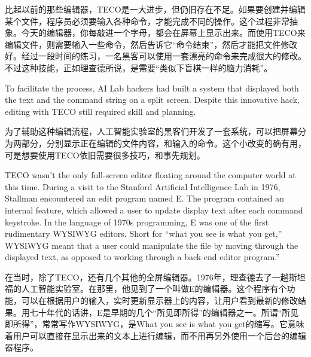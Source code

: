 \ifdefined\chs
比起以前的那些编辑器，TECO是一大进步，但仍旧存在不足。如果要创建并编辑某个文件，程序员必须要输入各种命令，才能完成不同的操作。这个过程非常抽象。今天的编辑器，你每敲进一个字母，都会在屏幕上显示出来。而使用TECO来编辑文件，则需要输入一些命令，然后告诉它“命令结束”，然后才能把文件修改好。经过一段时间的练习，一名黑客可以使用一套漂亮的命令来完成很大的修改。不过这种技能，正如理查德所说，是需要“类似下盲棋一样的脑力消耗”。
\fi

\ifdefined\eng
To facilitate the process, AI Lab hackers had built a system that displayed both the text and the command string on a split screen. Despite this innovative hack, editing with TECO still required skill and planning.
\fi

\ifdefined\chs
为了辅助这种编辑流程，人工智能实验室的黑客们开发了一套系统，可以把屏幕分为两部分，分别显示正在编辑的文件内容，和输入的命令。这个小改变的确有用，可是想要使用TECO依旧需要很多技巧，和事先规划。
\fi

\ifdefined\eng
TECO wasn't the only full-screen editor floating around the computer world at this time. During a visit to the Stanford Artificial Intelligence Lab in 1976, Stallman encountered an edit program named E. The program contained an internal feature, which allowed a user to update display text after each command keystroke. In the language of 1970s programming, E was one of the first rudimentary WYSIWYG editors. Short for ``what you see is what you get,'' WYSIWYG meant that a user could manipulate the file by moving through the displayed text, as opposed to working through a back-end editor program.''
\fi

\ifdefined\chs
在当时，除了TECO，还有几个其他的全屏编辑器。1976年，理查德去了一趟斯坦福的人工智能实验室。在那里，他见到了一个叫做E的编辑器。这个程序有个功能，可以在根据用户的输入，实时更新显示器上的内容，让用户看到最新的修改结果。用七十年代的话讲，E是早期的几个“所见即所得”的编辑器之一。所谓“所见即所得”，常常写作WYSIWYG，是What you see is what you get的缩写。它意味着用户可以直接在显示出来的文本上进行编辑，而不用再另外使用一个后台的编辑器程序。
\fi


